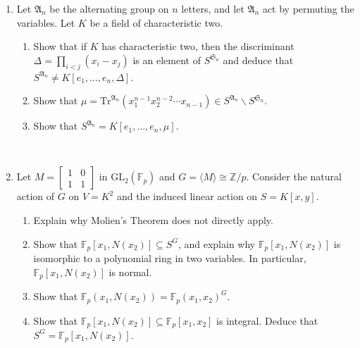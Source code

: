 \documentclass[12pt]{amsart}
\theoremstyle{definition}
\numberwithin{equation}{theorem}
\def\FF{\mathbb{F}}
\def\ZZ{\mathbb{Z}}
\begin{document}
\begin{enumerate}
\

\item Let $\mathfrak{A}_n$ be the alternating group on $n$ letters, and let $\mathfrak{A}_n$ act by permuting the variables. Let $K$ be a field of characteristic two.
\begin{enumerate}
\item Show that if $K$ has characteristic two, then the discriminant $\Delta= \prod_{i<j} (x_i-x_j)$ is an element of 
$S^{\mathfrak{S}_n}$ and deduce that $S^{\mathfrak{A}_n} \neq K[e_1,\dots,e_n, \Delta]$.
\item Show that $\mu=\mathrm{Tr}^{\mathfrak{A}_n} (x_1^{n-1} x_2^{n-2} \cdots x_{n-1}) \in S^{\mathfrak{A}_n} \smallsetminus S^{\mathfrak{S}_n}$.
\item Show that $S^{\mathfrak{A}_n} = K[e_1,\dots,e_n, \mu]$. 
\end{enumerate}

\


\item Let $\displaystyle M = \begin{bmatrix} 1 & 0 \\ 1 & 1 \end{bmatrix}$
in $\mathrm{GL}_2(\FF_p)$ and $G=\langle M  \rangle \cong \ZZ/p$. Consider the natural action of $G$ on $V=K^2$ and the induced linear action on $S=K[x,y]$.
\begin{enumerate}
\item Explain why Molien's Theorem does not directly apply.
\item Show that $\FF_p[x_1, N(x_2)] \subseteq S^G$, and explain why $\FF_p[x_1, N(x_2)]$ is isomorphic to a polynomial ring in two variables. In particular, $\FF_p[x_1, N(x_2)]$ is normal.
\item Show that $\FF_p(x_1, N(x_2)) = \FF_p(x_1,x_2)^G$.
\item Show that $\FF_p[x_1, N(x_2)] \subseteq \FF_p[x_1,x_2]$ is integral. Deduce that 
$S^G=\FF_p[x_1, N(x_2)]$.
\end{enumerate}

\


\end{enumerate}
\end{document}
